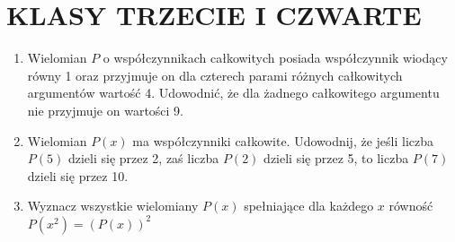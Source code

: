 \documentclass[10pt]{article}
\begin{document}
\section*{KLASY TRZECIE I CZWARTE}
\begin{enumerate}
  \item Wielomian \(P\) o współczynnikach całkowitych posiada współczynnik wiodący równy 1 oraz przyjmuje on dla czterech parami różnych całkowitych argumentów wartość 4. Udowodnić, że dla żadnego całkowitego argumentu nie przyjmuje on wartości 9.
  \item Wielomian \(P(x)\) ma współczynniki całkowite. Udowodnij, że jeśli liczba \(P(5)\) dzieli się przez 2, zaś liczba \(P(2)\) dzieli się przez 5, to liczba \(P(7)\) dzieli się przez 10.
  \item Wyznacz wszystkie wielomiany \(P(x)\) spełniające dla każdego \(x\) równość \(P\left(x^{2}\right)=(P(x))^{2}\)
\end{enumerate}
\end{document}

